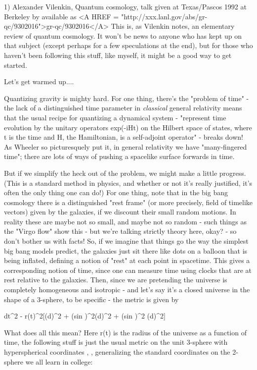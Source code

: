 

1) Alexander Vilenkin,
Quantum cosmology, talk given at Texas/Pascos 1992 at Berkeley by
available as <A HREF = "http://xxx.lanl.gov/abs/gr-qc/9302016">gr-qc/9302016</A> 
This is, as Vilenkin notes, an elementary review of quantum cosmology.
It won't be news to anyone who has kept up on that subject (except
perhaps for a few speculations at the end), but for those who haven't
been following this stuff, like myself, it might be a good way to get
started.   

Let's get warmed up....

Quantizing gravity is mighty hard.  For one thing, there's the "problem
of time" - the lack of a distinguished time parameter in \emph{classical}
general relativity means that the usual recipe for quantizing a
dynamical system - "represent time evolution by the unitary operators
exp(-iHt) on the Hilbert space of states, where t is the time and H, the
Hamiltonian, is a self-adjoint operator" - breaks down!  As Wheeler so
picturesquely put it, in general relativity we have "many-fingered
time"; there are lots of ways of pushing a spacelike surface forwards in
time.  

But if we simplify the heck out of the problem, we might make a little
progress.  (This is a standard method in physics, and whether or not
it's really justified, it's often the only thing one can do!)
For one thing, note that in the big bang cosmology there is a
distinguished "rest frame" (or more precisely, field of timelike
vectors) given by the galaxies, if we discount their small random
motions.  In reality these are maybe not so small, and maybe not so
random - such things as the "Virgo flow" show this - but we're talking
strictly theory here, okay? - so don't bother us with facts!  So, if we
imagine that things go the way the simplest big bang models predict, the
galaxies just sit there like dots on a balloon that is being inflated,
defining a notion of "rest" at each point in spacetime.  This gives
a corresponding notion of time, since one can measure time using
clocks that are at rest relative to the galaxies.  Then, since we are
pretending the universe is completely homogeneous and isotropic - and
let's say it's a closed universe in the shape of a 3-sphere, to be 
specific - the metric is given by

dt^{2} - r(t)^{2}[(d\psi )^{2} + (sin \psi )^{2}{(d\theta )^{2} + (sin \theta )^{2} (d\phi )^{2}}]

What does all this mean?  Here r(t) is the radius of the universe as a
function of time, the following stuff is just the usual metric on the
unit 3-sphere with hyperspherical coordinates \psi , \theta , \phi 
generalizing the standard coordinates on the 2-sphere we all learn in
college:

